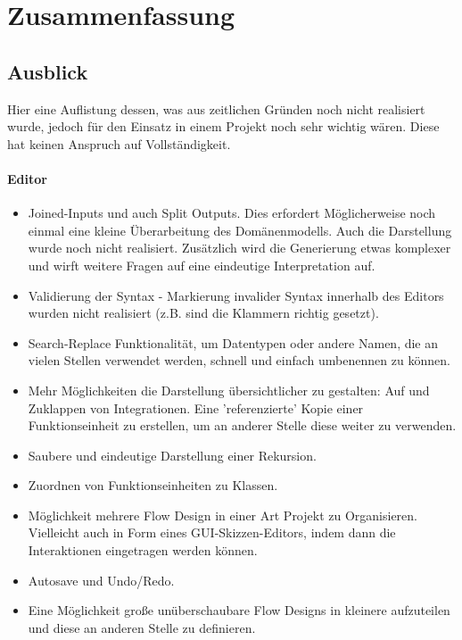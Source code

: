 \chapter{Zusammenfassung}
\section{Ausblick}
Hier eine Auflistung dessen, was aus zeitlichen Gründen noch nicht realisiert
wurde, jedoch für den Einsatz in einem Projekt noch sehr wichtig wären.
Diese hat keinen Anspruch auf Vollständigkeit.
\subsubsection{Editor}
\begin{itemize}
	\item Joined-Inputs und auch Split Outputs. Dies erfordert Möglicherweise noch einmal
	eine kleine Überarbeitung des Domänenmodells. Auch die Darstellung wurde noch nicht realisiert. Zusätzlich wird die Generierung etwas komplexer und wirft weitere Fragen auf eine eindeutige Interpretation auf.
	
	\item Validierung der Syntax - Markierung invalider Syntax innerhalb des Editors wurden nicht realisiert (z.B. sind die Klammern richtig gesetzt).
	
	\item Search-Replace Funktionalität, um Datentypen oder andere Namen, die an vielen Stellen verwendet werden, schnell und  einfach umbenennen zu können.
	
	\item Mehr Möglichkeiten die Darstellung übersichtlicher zu gestalten: Auf und
	Zuklappen von Integrationen. Eine 'referenzierte' Kopie einer
	Funktionseinheit zu erstellen, um an anderer Stelle diese weiter zu
	verwenden.
	\item Saubere und eindeutige Darstellung einer Rekursion.
	\item Zuordnen von Funktionseinheiten zu Klassen.
	\item Möglichkeit mehrere Flow Design in einer Art Projekt zu Organisieren.
	Vielleicht auch in Form eines GUI-Skizzen-Editors, indem dann die
	Interaktionen eingetragen werden können.
	\item Autosave und Undo/Redo.
	\item Eine Möglichkeit große unüberschaubare Flow Designs in kleinere aufzuteilen und diese an anderen Stelle zu definieren.
	
\end{itemize}


